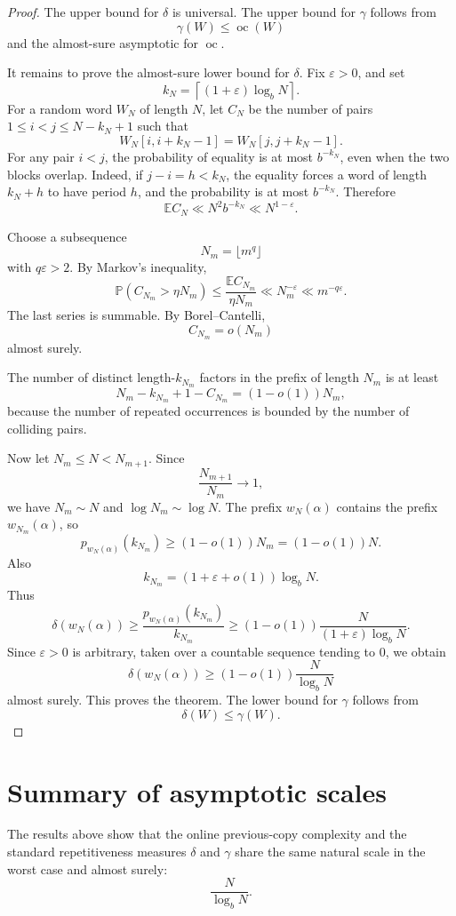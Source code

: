 \documentclass[11pt]{amsart}
\DeclareMathOperator{\oc}{oc}
\begin{document}
\begin{proof}
The upper bound for $\delta$ is universal. The upper bound for $\gamma$ follows from
\[
\gamma(W)\leq\oc(W)
\]
and the almost-sure asymptotic for $\oc$.

It remains to prove the almost-sure lower bound for $\delta$. Fix $\varepsilon>0$, and set
\[
k_N=\left\lceil(1+\varepsilon)\log_b N\right\rceil.
\]
For a random word $W_N$ of length $N$, let $C_N$ be the number of pairs $1\leq i<j\leq N-k_N+1$ such that
\[
W_N[i,i+k_N-1]=W_N[j,j+k_N-1].
\]
For any pair $i<j$, the probability of equality is at most $b^{-k_N}$, even when the two blocks overlap. Indeed, if $j-i=h<k_N$, the equality forces a word of length $k_N+h$ to have period $h$, and the probability is at most $b^{-k_N}$. Therefore
\[
\mathbb E C_N
\ll
N^2b^{-k_N}
\ll
N^{1-\varepsilon}.
\]

Choose a subsequence
\[
N_m=\lfloor m^q\rfloor
\]
with $q\varepsilon>2$. By Markov's inequality,
\[
\mathbb P(C_{N_m}>\eta N_m)
\leq
\frac{\mathbb E C_{N_m}}{\eta N_m}
\ll
N_m^{-\varepsilon}
\ll
m^{-q\varepsilon}.
\]
The last series is summable. By Borel--Cantelli,
\[
C_{N_m}=o(N_m)
\]
almost surely.

The number of distinct length-$k_{N_m}$ factors in the prefix of length $N_m$ is at least
\[
N_m-k_{N_m}+1-C_{N_m}
=
(1-o(1))N_m,
\]
because the number of repeated occurrences is bounded by the number of colliding pairs.

Now let $N_m\leq N<N_{m+1}$. Since
\[
\frac{N_{m+1}}{N_m}\to1,
\]
we have $N_m\sim N$ and $\log N_m\sim\log N$. The prefix $w_N(\alpha)$ contains the prefix $w_{N_m}(\alpha)$, so
\[
p_{w_N(\alpha)}(k_{N_m})
\geq
(1-o(1))N_m
=
(1-o(1))N.
\]
Also
\[
k_{N_m}
=
(1+\varepsilon+o(1))\log_b N.
\]
Thus
\[
\delta(w_N(\alpha))
\geq
\frac{p_{w_N(\alpha)}(k_{N_m})}{k_{N_m}}
\geq
(1-o(1))\frac{N}{(1+\varepsilon)\log_b N}.
\]
Since $\varepsilon>0$ is arbitrary, taken over a countable sequence tending to $0$, we obtain
\[
\delta(w_N(\alpha))
\geq
(1-o(1))\frac{N}{\log_b N}
\]
almost surely. This proves the theorem. The lower bound for $\gamma$ follows from
\[
\delta(W)\leq\gamma(W).
\]
\end{proof}

\section{Summary of asymptotic scales}

The results above show that the online previous-copy complexity and the standard repetitiveness measures $\delta$ and $\gamma$ share the same natural scale in the worst case and almost surely:
\[
\frac{N}{\log_b N}.
\]
\end{document}
